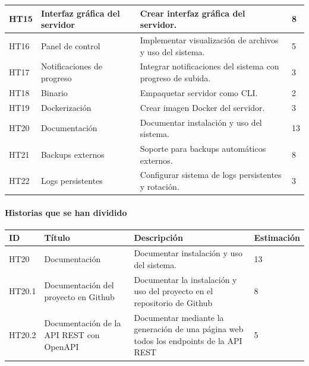 \begin{tabularx}{\textwidth}{|l|l|>{\raggedright\arraybackslash}X|l|}
    \hline
    HT15 & Interfaz gráfica del servidor & Crear interfaz gráfica del servidor. & 8 \\
    \hline
    HT16 & Panel de control & Implementar visualización de archivos y uso del sistema. & 5 \\
    \hline
    HT17 & Notificaciones de progreso & Integrar notificaciones del sistema con progreso de subida. & 3 \\
    \hline
    HT18 & Binario & Empaquetar servidor como CLI. & 2 \\
    \hline
    HT19 & Dockerización & Crear imagen Docker del servidor. & 3 \\
    \hline
    HT20 & Documentación & Documentar instalación y uso del sistema. & 13 \\
    \hline
    HT21 & Backups externos & Soporte para backups automáticos externos. & 8 \\
    \hline
    HT22 & Logs persistentes & Configurar sistema de logs persistentes y rotación. & 3 \\
    \hline
\end{tabularx}

\paragraph{Historias que se han dividido}

\begin{tabularx}{\textwidth}{|l|X|>{\raggedright\arraybackslash}X|l|}
    \hline
    ID & Título & Descripción & Estimación \\
    \hline
    HT20 & Documentación & Documentar instalación y uso del sistema. & 13 \\
    \hline
    HT20.1 & Documentación del proyecto en Github & Documentar la instalación y uso del proyecto en el repositorio de Github & 8 \\
    \hline
    HT20.2 &  Documentación de la API REST con OpenAPI & Documentar mediante la generación de una página web todos los endpoints de la API REST & 5 \\
    \hline
\end{tabularx}

\newpage
